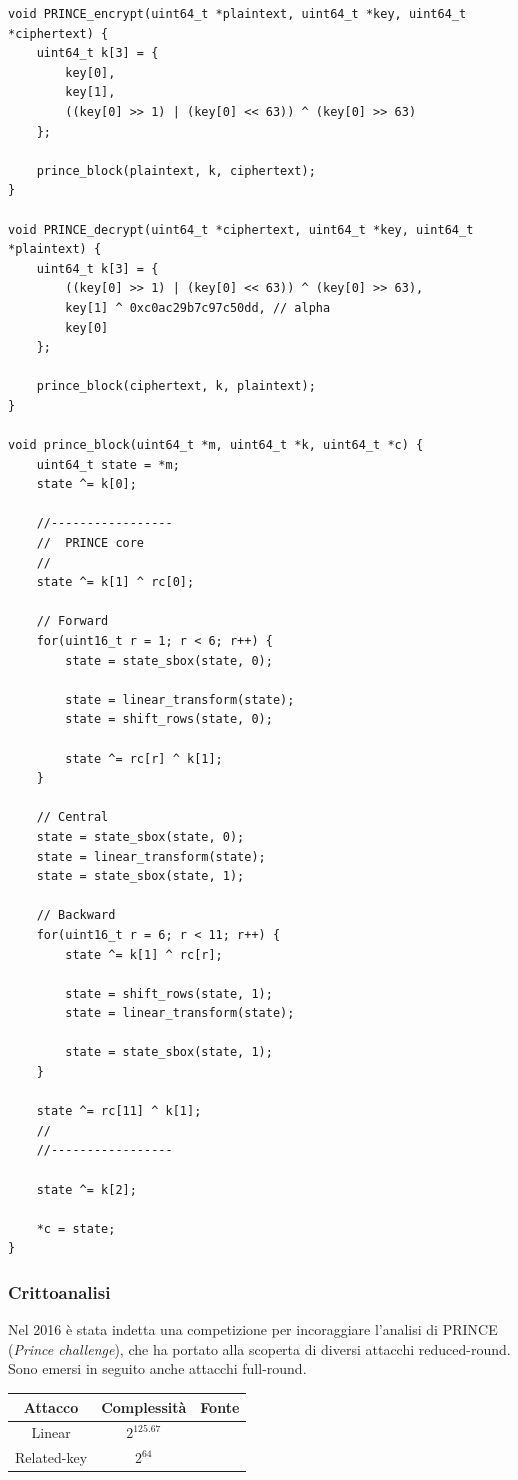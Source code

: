 \documentclass[target=bach,aauheader=,style=]{thud}
\begin{document}
						\begin{algorithm}
				\caption{Codice C PRINCE}
\begin{lstlisting}[style=CStyle]
void PRINCE_encrypt(uint64_t *plaintext, uint64_t *key, uint64_t *ciphertext) {
	uint64_t k[3] = {
		key[0],
		key[1],
		((key[0] >> 1) | (key[0] << 63)) ^ (key[0] >> 63)
	};
	
	prince_block(plaintext, k, ciphertext);
}

void PRINCE_decrypt(uint64_t *ciphertext, uint64_t *key, uint64_t *plaintext) {
	uint64_t k[3] = {
		((key[0] >> 1) | (key[0] << 63)) ^ (key[0] >> 63),
		key[1] ^ 0xc0ac29b7c97c50dd, // alpha
		key[0]
	};
	
	prince_block(ciphertext, k, plaintext);
}

void prince_block(uint64_t *m, uint64_t *k, uint64_t *c) {
	uint64_t state = *m;
	state ^= k[0];
	
	//-----------------
	//	PRINCE core
	//
	state ^= k[1] ^ rc[0];
	
	// Forward
	for(uint16_t r = 1; r < 6; r++) {
		state = state_sbox(state, 0);
		
		state = linear_transform(state);
		state = shift_rows(state, 0);
		
		state ^= rc[r] ^ k[1];
	}
	
	// Central
	state = state_sbox(state, 0);
	state = linear_transform(state);
	state = state_sbox(state, 1);
	
	// Backward
	for(uint16_t r = 6; r < 11; r++) {
		state ^= k[1] ^ rc[r];
		
		state = shift_rows(state, 1);
		state = linear_transform(state);
		
		state = state_sbox(state, 1);
	}
	
	state ^= rc[11] ^ k[1];
	//
	//-----------------
	
	state ^= k[2];
	
	*c = state;
}\end{lstlisting}
			\end{algorithm}
			\subsubsection{Crittoanalisi}
			Nel 2016 è stata indetta una competizione per incoraggiare l'analisi di PRINCE (\textit{Prince challenge}), che ha portato alla scoperta di diversi attacchi reduced-round. Sono emersi in seguito anche attacchi full-round.
			\begin{center}
				\begin{tabular}{ |c|c|c| } 
					\hline
					Attacco & Complessità & Fonte \\ 
					\hline 
					\hline
					Linear & $2^{125.67}$ & \cite{princesec}\\
					\hline
					Related-key & $2^{64}$ & \cite{princesec}\\
					\hline
				\end{tabular}
			\end{center}
\end{document}
